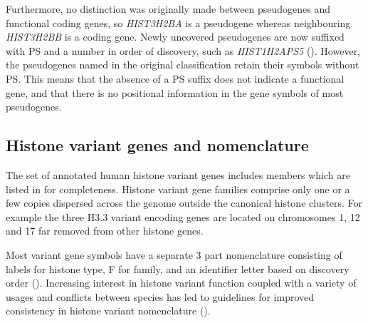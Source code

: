 	Furthermore, no distinction was originally made between pseudogenes and functional coding genes,
	so \textit{HIST3H2BA} is a pseudogene whereas neighbouring \textit{HIST3H2BB} is a coding gene.
	Newly uncovered pseudogenes are now suffixed with PS and a number in order of discovery,
	such as \textit{HIST1H2APS5} (). 
	However, the pseudogenes named in the original classification retain their symbols without PS.
	This means that the absence of a PS suffix does not indicate a functional gene, 
	and that there is no positional information in the gene symbols of most pseudogenes.

\subsection{Histone variant genes and nomenclature}
	The set of annotated human histone variant genes 
	includes  members 
	which are listed in  for completeness.
	Histone variant gene families comprise only one or a few copies 
	dispersed across the genome outside the canonical histone clusters.
	For example the three H3.3 variant encoding genes are located 
	on chromosomes 1, 12 and 17 far removed from other histone genes.

	Most variant gene symbols have a separate 3 part nomenclature 
	consisting of labels for histone type, F for family, 
	and an identifier letter based on discovery order ().
	Increasing interest in histone variant function \citep{MazeAllis2014}
	coupled with a variety of usages and conflicts between species 
	has led to guidelines for improved consistency in histone variant nomenclature \citep{Talbert2012} ().

